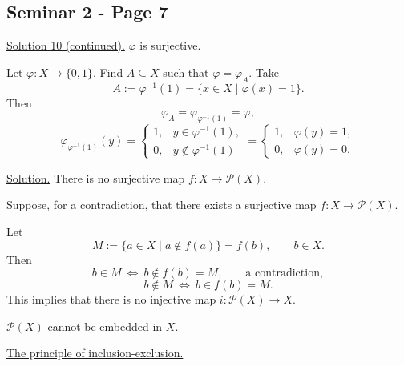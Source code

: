 
\subsection*{Seminar 2 - Page 7}

\noindent\underline{Solution 10 (continued).} $\varphi$ is surjective.

\noindent Let $\varphi:X\longrightarrow\{0,1\}$. Find $A\subseteq X$ such
that $\varphi=\varphi_A$. Take
\[
 A:=\varphi^{-1}(1)=\{x\in X\mid\varphi(x)=1\}.
\]
\noindent Then
\[
 \varphi_A=\varphi_{\varphi^{-1}(1)}=\varphi,
\]
\[
 \varphi_{\varphi^{-1}(1)}(y)=
 \begin{cases}
  1,& y\in\varphi^{-1}(1),\\
  0,& y\notin\varphi^{-1}(1)
 \end{cases}
 =
 \begin{cases}
  1,&\varphi(y)=1,\\
  0,&\varphi(y)=0.
 \end{cases}
\]

\bigskip
\noindent{}\quad\underline{Solution.} There is no surjective map
$f:X\longrightarrow\mathcal{P}(X)$.

\noindent Suppose, for a contradiction, that there exists a surjective map
$f:X\longrightarrow\mathcal{P}(X)$.

\noindent Let
\[
 M:=\{a\in X\mid a\notin f(a)\}=f(b),\qquad b\in X.
\]
\noindent Then
\[
 b\in M\ \Longleftrightarrow\ b\notin f(b)=M,\qquad\text{a contradiction},
\]
\[
 b\notin M\ \Longleftrightarrow\ b\in f(b)=M.
\]
\noindent This implies that there is no injective map
$i:\mathcal{P}(X)\longrightarrow X$.

\noindent $\mathcal{P}(X)$ cannot be embedded in $X$.

\bigskip
\noindent\underline{The principle of inclusion-exclusion.}

